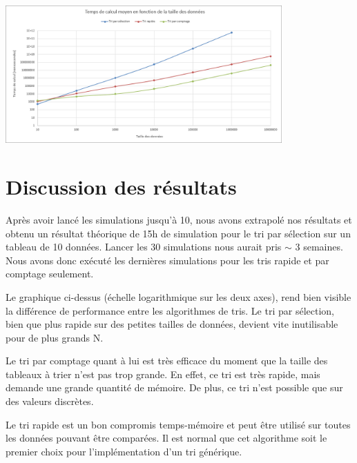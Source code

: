 \documentclass[11pt]{article}
\begin{document}
\noindent\includegraphics[width=400px]{tests/graphique}

\medskip
\clearpage

\section*{Discussion des résultats}
Après avoir lancé les simulations jusqu'à 10, nous avons extrapolé nos résultats et obtenu un résultat théorique de 15h de simulation pour le tri par sélection sur un tableau de 10 données. Lancer les 30 simulations nous aurait pris $\sim $ 3 semaines. Nous avons donc exécuté les dernières simulations pour les tris rapide et par comptage seulement.

Le graphique ci-dessus (échelle logarithmique sur les deux axes), rend bien visible la différence de performance entre les algorithmes de tris. Le tri par sélection, bien que plus rapide sur des petites tailles de données, devient vite inutilisable pour de plus grands N.

Le tri par comptage quant à lui est très efficace du moment que la taille des tableaux à trier n'est pas trop grande. En effet, ce tri est très rapide, mais demande une grande quantité de mémoire. De plus, ce tri n'est possible que sur des valeurs discrètes.

Le tri rapide est un bon compromis temps-mémoire et peut être utilisé sur toutes les données pouvant être comparées. Il est normal que cet algorithme soit le premier choix pour l'implémentation d'un tri générique. 



\end{document}
